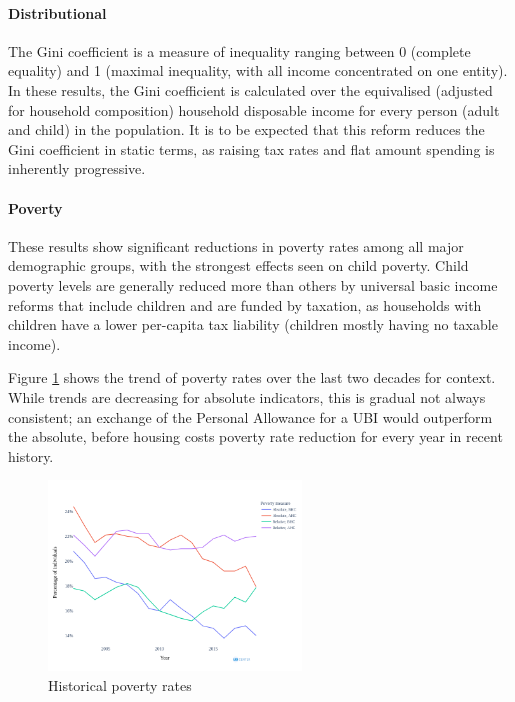 \documentclass{article}
\begin{document}
    \paragraph{Distributional} The Gini coefficient is a measure of inequality ranging between 0 (complete equality) and 1 (maximal inequality, with all income concentrated on one entity). In these results, the Gini coefficient is calculated over the equivalised (adjusted for household composition) household disposable income for every person (adult and child) in the population. It is to be expected that this reform reduces the Gini coefficient in static terms, as raising tax rates and flat amount spending is inherently progressive.
    
    \paragraph{Poverty} These results show significant reductions in poverty rates among all major demographic groups, with the strongest effects seen on child poverty. Child poverty levels are generally reduced more than others by universal basic income reforms that include children and are funded by taxation, as households with children have a lower per-capita tax liability (children mostly having no taxable income). 
    
    Figure \ref{fig:poverty_rates_hist} shows the trend of poverty rates over the last two decades for context. While trends are decreasing for absolute indicators, this is gradual not always consistent; an exchange of the Personal Allowance for a UBI would outperform the absolute, before housing costs poverty rate reduction for every year in recent history.

    \begin{figure}
        \centering
        \includegraphics[width=0.6\textwidth]{images/fig_5.png}
        \caption{Historical poverty rates}
        \label{fig:poverty_rates_hist}
    \end{figure}
    
\end{document}
